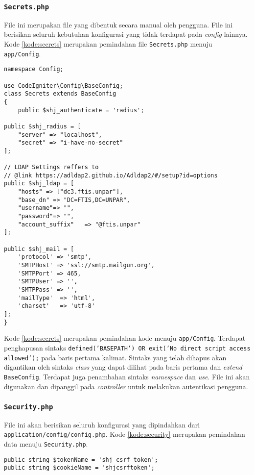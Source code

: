 \subsubsection{\texttt{Secrets.php}}
File ini merupakan file yang dibentuk secara manual oleh pengguna. File ini berisikan seluruh kebutuhan konfigurasi yang tidak terdapat pada \textit{config} lainnya. Kode \ref{kode:secrets} merupakan pemindahan file \texttt{Secrets.php} menuju \texttt{app/Config}.
\begin{lstlisting}[caption=Penambahan file \textit{secrets}, label=kode:secrets]
namespace Config;

use CodeIgniter\Config\BaseConfig;
class Secrets extends BaseConfig
{ 
	public $shj_authenticate = 'radius';

public $shj_radius = [
    "server" => "localhost",
    "secret" => "i-have-no-secret"
];

// LDAP Settings reffers to
// @link https://adldap2.github.io/Adldap2/#/setup?id=options
public $shj_ldap = [
    "hosts" => ["dc3.ftis.unpar"],
    "base_dn" => "DC=FTIS,DC=UNPAR",
    "username"=> "",
    "password"=> "",
    "account_suffix"   => "@ftis.unpar"
];

public $shj_mail = [
    'protocol' => 'smtp',
    'SMTPHost' => 'ssl://smtp.mailgun.org',
    'SMTPPort' => 465,
    'SMTPUser' => '',
    'SMTPPass' => '',
    'mailType'  => 'html',
    'charset'   => 'utf-8'
];
}
\end{lstlisting}

Kode \ref{kode:secrets} merupakan pemindahan kode menuju \texttt{app/Config}. Terdapat penghapusan sintaks \texttt{defined('BASEPATH') OR exit('No direct script access allowed');} pada baris pertama kalimat. Sintaks yang telah dihapus akan digantikan oleh sintaks \textit{class} yang dapat dilihat pada baris pertama dan \textit{extend} \texttt{BaseConfig}. Terdapat juga penambahan sintaks \textit{namespace} dan \textit{use}. File ini akan digunakan dan dipanggil pada \textit{controller} untuk melakukan autentikasi pengguna.

\subsubsection{\texttt{Security.php}}
File ini akan berisikan seluruh konfigurasi yang dipindahkan dari \texttt{application/config/config.php}. Kode \ref{kode:security} merupakan pemindahan data menuju \texttt{Security.php}.
\begin{lstlisting}[caption=Pemindahan file \textit{config} menuju \textit{Security}, label=kode:security]
public string $tokenName = 'shj_csrf_token';
public string $cookieName = 'shjcsrftoken';
\end{lstlisting}

